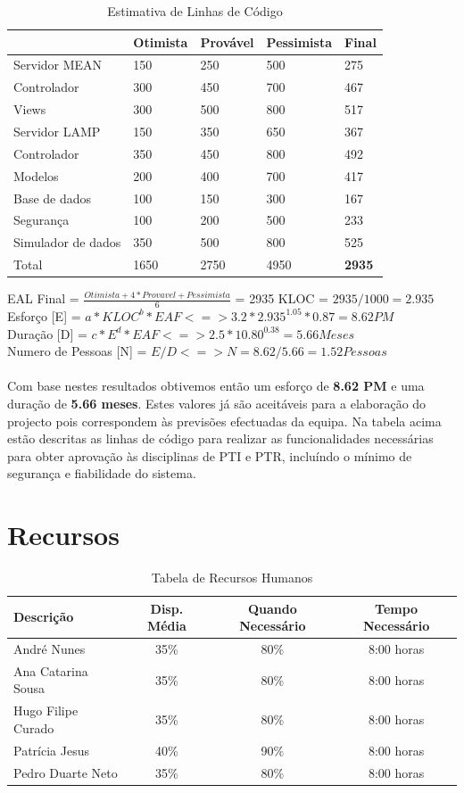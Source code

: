 \documentclass[a4paper]{report}
\begin{document}
\begin{table}[h]
\centering
\label{my-label}
\begin{tabular}{l|l|l|l|l}
 & Otimista & Provável & Pessimista & Final \\ \hline
Servidor MEAN & 150 & 250 & 500 & 275 \\ \hline
Controlador & 300 & 450 & 700 & 467 \\ \hline
Views & 300 & 500 & 800 & 517 \\ \hline
Servidor LAMP & 150 & 350 & 650 & 367 \\ \hline
Controlador & 350 & 450 & 800 & 492 \\ \hline
Modelos & 200 & 400 & 700 & 417 \\ \hline
Base de dados & 100 & 150 & 300 & 167 \\ \hline
Segurança & 100 & 200 & 500 & 233 \\ \hline
Simulador de dados & 350 & 500 & 800 & 525 \\ \hline
Total & 1650 & 2750 & 4950 & \textbf{2935}
\end{tabular}
\caption{Estimativa de Linhas de Código}
\end{table}
EAL Final = $\frac{Otimista + 4 * Provavel + Pessimista}{6}$ = 2935
KLOC = $2935 / 1000 = 2.935$ \\
Esforço [E] = $a * KLOC^{b} * EAF <=> 3.2 * 2.935^{1.05} * 0.87 = 8.62 PM$\\
Duração [D] = $c * E^{d} * EAF <=> 2.5 * 10.80^{0.38} = 5.66 Meses$\\
Numero de Pessoas [N] = $E / D <=> N = 8.62 / 5.66 = 1.52 Pessoas$\\\\

Com base nestes resultados obtivemos então um esforço de \textbf{8.62 PM} e uma duração de \textbf{5.66 meses}. Estes valores já são aceitáveis para a elaboração do projecto pois correspondem às previsões efectuadas da equipa. Na tabela acima estão descritas as linhas de código para realizar as funcionalidades necessárias para obter aprovação às disciplinas de PTI e PTR, incluíndo o mínimo de segurança e fiabilidade do sistema.

\pagebreak
\section{Recursos}
\begin{table}[h]
\centering
\begin{tabularx}{\textwidth}{X|c|c|c}
\textbf{Descrição} & \textbf{Disp. Média} & \textbf{Quando Necessário} & \textbf{Tempo Necessário} \\ \hline
André Nunes & 35\% & 80\%  & 8:00 horas \\ \hline
Ana Catarina Sousa & 35\% & 80\% & 8:00 horas \\ \hline
Hugo Filipe Curado & 35\% & 80\% & 8:00 horas \\ \hline
Patrícia Jesus & 40\% & 90\% & 8:00 horas \\ \hline
Pedro Duarte Neto & 35\% & 80\% & 8:00 horas \\
\end{tabularx}
\caption{Tabela de Recursos Humanos}
\label{TabRH}
\end{table}
\end{document}
